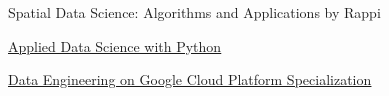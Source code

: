 \begin{coursework}


        {Spatial Data Science: Algorithms and Applications by Rappi}

        {\href{https://www.youracclaim.com/badges/6f524dff-5ffb-42bd-8e32-f4f3ea50e26c/public_url}
        {\underline{Applied Data Science with Python}}}

        {\href{https://www.coursera.org/account/accomplishments/specialization/certificate/3MKRH4BJ5MKQ}
        {\underline{Data Engineering on Google Cloud Platform Specialization}}}

\end{coursework}